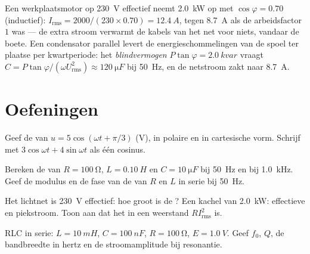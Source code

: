 \begin{example}\label{ex:b1:sinusoidal-impedance:pf}
Een werkplaatsmotor op \qty{230}{V} effectief neemt \qty{2.0}{kW} op met
$\cos\varphi = 0.70$ (inductief): $I_{\mathrm{rms}} = 2000/(230 \times
0.70) = \qty{12.4}{A}$, tegen \qty{8.7}{A} als de arbeidsfactor
$1$ was --- de extra stroom verwarmt de kabels van het net voor niets, vandaar
de boete. Een condensator parallel levert de energieschommelingen van de spoel
ter plaatse per kwartperiode: het \emph{blindvermogen} $P\tan\varphi =
\qty{2.0}{kvar}$ vraagt $C = P\tan\varphi/(\omega U_{\mathrm{rms}}^2)
\approx \qty{120}{\micro F}$ bij \qty{50}{Hz}, en de netstroom zakt
naar \qty{8.7}{A}.
\end{example}

\section{Oefeningen}

\begin{exercise}[$\star$]\label{exo:b1:sinusoidal-impedance:1}
Geef de  van $u = 5\cos(\omega t + \pi/3)$ (V), in
polaire en in cartesische vorm. Schrijf met  $3\cos\omega t
+ 4\sin\omega t$ als één cosinus.
\end{exercise}

\begin{exercise}[$\star$]\label{exo:b1:sinusoidal-impedance:2}
Bereken de  van $R = \qty{100}{\ohm}$, $L = \qty{0.10}{H}$ en
$C = \qty{10}{\micro F}$ bij \qty{50}{Hz} en bij \qty{1.0}{kHz}. Geef de
modulus en de fase van de  van $R$ en $L$ in serie bij
\qty{50}{Hz}.
\end{exercise}

\begin{exercise}[$\star$]\label{exo:b1:sinusoidal-impedance:3}
Het lichtnet is \qty{230}{V} effectief: hoe groot is de ? Een kachel van
\qty{2.0}{kW}: effectieve en piekstroom. Toon aan dat het  in een weerstand
$RI_{\mathrm{rms}}^2$ is.
\end{exercise}

\begin{exercise}[$\star$]\label{exo:b1:sinusoidal-impedance:4}
RLC in serie: $L = \qty{10}{mH}$, $C = \qty{100}{nF}$, $R = \qty{100}{\ohm}$,
$E = \qty{1.0}{V}$. Geef $f_0$, $Q$, de bandbreedte in hertz en de
stroomamplitude bij resonantie.
\end{exercise}

